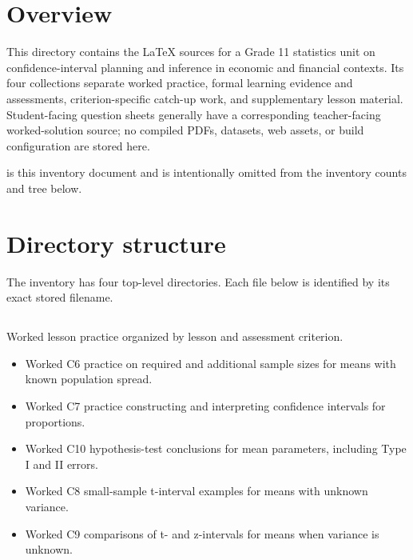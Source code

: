 


\newcommand{\StructureDocumentTitle}{Grade 11 — Term 2 Structure}
\StructureTitlePage{\StructureDocumentTitle}
\tableofcontents
\clearpage

\section{Overview}

This directory contains the LaTeX sources for a Grade 11 statistics unit on confidence-interval planning and inference in economic and financial contexts. Its four collections separate worked practice, formal learning evidence and assessments, criterion-specific catch-up work, and supplementary lesson material. Student-facing question sheets generally have a corresponding teacher-facing worked-solution source; no compiled PDFs, datasets, web assets, or build configuration are stored here.

 is this inventory document and is intentionally omitted from the inventory counts and tree below.

\section{Directory structure}

The inventory has four top-level directories. Each file below is identified by its exact stored filename.

\subsection{}

Worked lesson practice organized by lesson and assessment criterion.

\begin{itemize}
  \item {}

  Worked C6 practice on required and additional sample sizes for means with known population spread.

  \item {}

  Worked C7 practice constructing and interpreting confidence intervals for proportions.

  \item {}

  Worked C10 hypothesis-test conclusions for mean parameters, including Type I and II errors.

  \item {}

  Worked C8 small-sample t-interval examples for means with unknown variance.

  \item {}

  Worked C9 comparisons of t- and z-intervals for means when variance is unknown.
\end{itemize}


